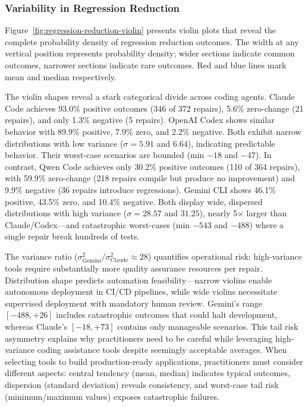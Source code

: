 \subsubsection{Variability in Regression Reduction}
\label{subsubsec:regression-reduction-violin}

Figure~\ref{fig:regression-reduction-violin} presents violin plots that reveal the complete probability density of regression reduction outcomes. The width at any vertical position represents probability density; wider sections indicate common outcomes, narrower sections indicate rare outcomes. Red and blue lines mark mean and median respectively.

The violin shapes reveal a stark categorical divide across coding agents. Claude Code achieves 93.0\% positive outcomes (346 of 372 repairs), 5.6\% zero-change (21 repairs), and only 1.3\% negative (5 repairs). OpenAI Codex shows similar behavior with 89.9\% positive, 7.9\% zero, and 2.2\% negative. Both exhibit narrow distributions with low variance ($\sigma=5.91$ and $6.64$), indicating predictable behavior. Their worst-case scenarios are bounded (min $-18$ and $-47$). In contrast, Qwen Code achieves only 30.2\% positive outcomes (110 of 364 repairs), with 59.9\% zero-change (218 repairs compile but produce no improvement) and 9.9\% negative (36 repairs introduce regressions). Gemini CLI shows 46.1\% positive, 43.5\% zero, and 10.4\% negative. Both display wide, dispersed distributions with high variance ($\sigma=28.57$ and $31.25$), nearly 5$\times$ larger than Claude/Codex—and catastrophic worst-cases (min $-543$ and $-488$) where a single repair break hundreds of tests.


The variance ratio ($\sigma_{\text{Gemini}}^2 / \sigma_{\text{Claude}}^2 \approx 28$) quantifies operational risk: high-variance tools require substantially more quality assurance resources per repair. Distribution shape predicts automation feasibility—narrow violins enable autonomous deployment in CI/CD pipelines, while wide violins necessitate supervised deployment with mandatory human review. Gemini's range $[-488, +26]$ includes catastrophic outcomes that could halt development, whereas Claude's $[-18, +73]$ contains only manageable scenarios. This tail risk asymmetry explains why practitioners need to be careful while leveraging high-variance coding assistance tools despite seemingly acceptable averages. When selecting tools to build production-ready applications, practitioners must consider different aspects: central tendency (mean, median) indicates typical outcomes, dispersion (standard deviation) reveals consistency, and worst-case tail risk (minimum/maximum values) exposes catastrophic failures.

